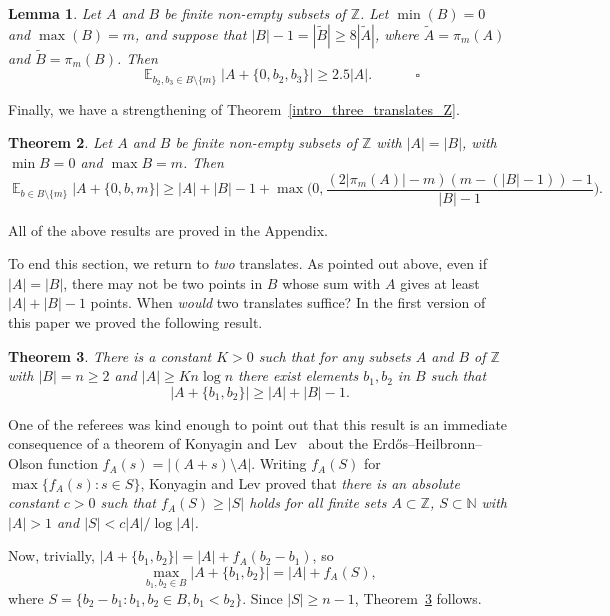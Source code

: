 \documentclass[12pt,reqno]{amsart}
\DeclareMathOperator*{\E}{\mathbb{E}}
\newtheorem{theorem}{Theorem}
\newtheorem{lemma}[theorem]{Lemma}
\theoremstyle{definition}
\renewcommand\geq{\geqslant}
\renewcommand\ge{\geqslant}
\begin{document}
\begin{lemma}\label{residue.vs2}
Let $A$ and $B$ be finite non-empty subsets of $\mathbb{Z}$. Let $\min(B)=0$ and $\max(B)=m$, and suppose that $|B|-1=|\widetilde{B}| \geq 8|\widetilde{A}|$, where $\widetilde{A}=\pi_m(A)$ and $\widetilde{B}=\pi_m(B)$. Then
\[
  \ \ \ \ \ \ \ \ \ \ \ \ \ \E_{b_2,b_3 \in B\setminus\{m\}} \bigg|A+\{0,b_2,b_3\}  \bigg|\geq 2.5|A|.
  \ \ \ \ \ \ \ \ \ \ \ \ \ \ \square
\]
\end{lemma}

Finally, we have a strengthening of Theorem~\ref{intro_three_translates_Z}.

\begin{theorem}\label{strengthening_of_three_translates}
  Let $A$ and $B$ be finite non-empty subsets of $\mathbb{Z}$
with $|A| = |B|$, with $\min B  = 0$ and $\max B =m$. Then
$$\E_{b\in B \setminus \{m\}}\bigg|A+\{0,b,m\}\bigg| \ge |A|+|B|-1+\max\bigg(0,\frac{(2|\pi_m(A)|-m)(
m-(|B|-1))-1}{|B|-1} \bigg).$$
\end{theorem}

All of the above results are proved in the Appendix.

\vspace{5pt}


To end this section, we return to {\em two} translates. As pointed out above, even if $|A|=|B|$, there may
not be two points in $B$ whose sum with $A$ gives at least $|A|+|B|-1$ points. When {\it would} two
translates suffice?
In the first version of this paper we proved the following result.
\begin{theorem}\label{two-translates}
There is a constant $K>0$ such that for any subsets $A$ and $B$ of $\mathbb{Z}$ with $|B|=n \geq 2$ and
$|A| \ge Kn\log n$ there exist elements $b_1,b_2$ in $B$
such that
\[
|A+\{b_1,b_2\}| \geq |A|+|B|-1.
\]
\end{theorem}
One of the referees was kind enough to point out that this result is an immediate
consequence of a theorem of Konyagin and Lev~\cite{KoLe} about the Erd\H{o}s--Heilbronn--Olson
function $f_A(s)=|(A+s)\setminus A|$. Writing $f_A(S)$ for $\max \{f_A(s): s\in S\}$,
Konyagin and Lev proved that {\em there is an absolute constant $c>0$ such that $f_A(S)\ge |S|$
holds for all finite sets $A\subset {\mathbb Z}$, $S\subset {\mathbb N}$ with $|A|>1$ and $|S|<c|A|/\log |A|$.}

\vspace{5pt}
Now, trivially, $|A+\{b_1, b_2\}|=|A|+f_A(b_2-b_1)$, so
\[
\max_{b_1, b_2 \in B} |A+\{b_1, b_2\}| = |A|+f_A(S),
\]
where $S=\{b_2-b_1: b_1, b_2 \in B, b_1<b_2\}$. Since $|S|\ge n-1$, Theorem~\ref{two-translates}
follows.
\end{document}
